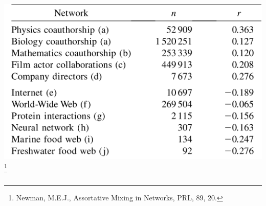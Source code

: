 \documentclass{beamer}
\begin{document}
\begin{frame}
    \frametitle{}
    \centering
    \includegraphics[width=\columnwidth]{assortativity_list.png}
\footnote{Newman, M.E.J., Assortative Mixing in Networks, PRL, 89, 20.}
\end{frame}
\begin{frame}
    \frametitle{}
\end{frame}
\begin{frame}
    \frametitle{}
\end{frame}
\begin{frame}
    \frametitle{}
\end{frame}
\begin{frame}
    \frametitle{}
\end{frame}
\begin{frame}
    \frametitle{}
\end{frame}
\begin{frame}
    \frametitle{}
\end{frame}
\begin{frame}
    \frametitle{}
\end{frame}
\end{document}
